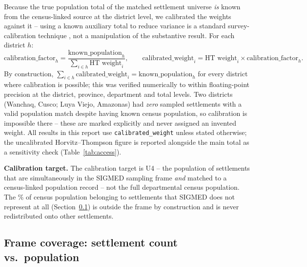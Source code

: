 Because the true population total of the matched settlement universe \emph{is} known from the census-linked source at the district level, we calibrated the weights against it -- using a known auxiliary total to reduce variance is a standard survey-calibration technique \citep{deville1992calibration}, not a manipulation of the substantive result. For each district $h$:
\[
  \text{calibration\_factor}_h = \frac{\text{known\_population}_h}{\displaystyle\sum_{i \in h} \text{HT weight}_i}, \qquad
  \text{calibrated\_weight}_i = \text{HT weight}_i \times \text{calibration\_factor}_h .
\]
By construction, $\sum_{i \in h} \text{calibrated\_weight}_i = \text{known\_population}_h$ for every district where calibration is possible; this was verified numerically to within floating-point precision at the district, province, department and total levels. Two districts (Wanchaq, Cusco; Luya Viejo, Amazonas) had \emph{zero} sampled settlements with a valid population match despite having known census population, so calibration is impossible there -- these are marked explicitly and never assigned an invented weight. All results in this report use \texttt{calibrated\_weight} unless stated otherwise; the uncalibrated Horvitz--Thompson figure is reported alongside the main total as a sensitivity check (Table~\ref{tab:access}).

\textbf{Calibration target.} The calibration target is U4 -- the population of settlements that are simultaneously in the SIGMED sampling frame \emph{and} matched to a census-linked population record -- not the full departmental census population. The \OutsideFramePct\% of census population belonging to settlements that SIGMED does not represent at all (Section~\ref{sec:frame}) is outside the frame by construction and is never redistributed onto other settlements.

\subsection{Frame coverage: settlement count vs.\ population}
\label{sec:frame}

